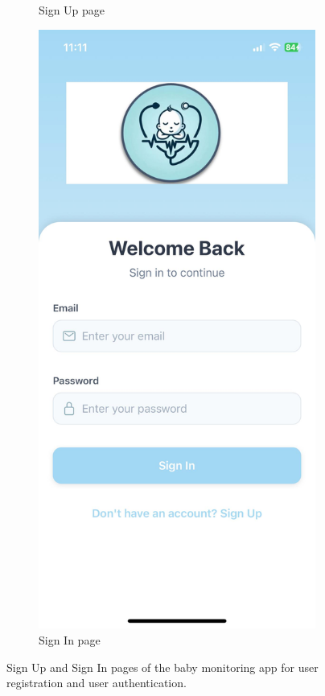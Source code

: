 \documentclass[12pt,a4paper]{report}
\begin{document}
\begin{figure}[H]
\begin{subfigure}[b]{0.22\textwidth}
    \caption{Sign Up page}
    \label{fig:sign-up}
\end{subfigure}
  \hspace{0.1\textwidth}
  \begin{subfigure}[b]{0.22\textwidth} %
      \centering
      \includegraphics[width=\textwidth]{./pic/sign-in.jpeg}
      \caption{Sign In page}
      \label{fig:sign-in}
  \end{subfigure}
  
  
  \caption{Sign Up and Sign In pages of the baby monitoring app for user registration and user authentication.}
    \label{fig:auth-pages}
\end{figure}
\end{document}
